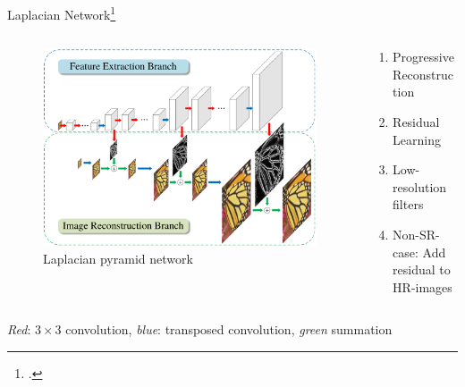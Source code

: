 \documentclass{beamer}
\begin{document}
\begin{frame}{Laplacian Network\footcite{LapSRN}}
\begin{columns}
\begin{column}{0.66\textwidth}
  \begin{figure}[h]
    \centering
    \includegraphics[width=1.0\textwidth]{lap_srn.png}
    \caption*{Laplacian pyramid network}
    \label{fig:lap-srn}
  \end{figure}
\end{column}

\begin{column}{0.34\textwidth}
  \begin{enumerate}
  \item Progressive Reconstruction
  \item Residual Learning
  \item Low-resolution filters
  \item Non-SR-case: Add residual to HR-images
  \end{enumerate}
\end{column}
\end{columns}
\textit{Red}: $3 \times 3$ convolution, \textit{blue}: transposed convolution, \textit{green} summation
\end{frame}
\end{document}
